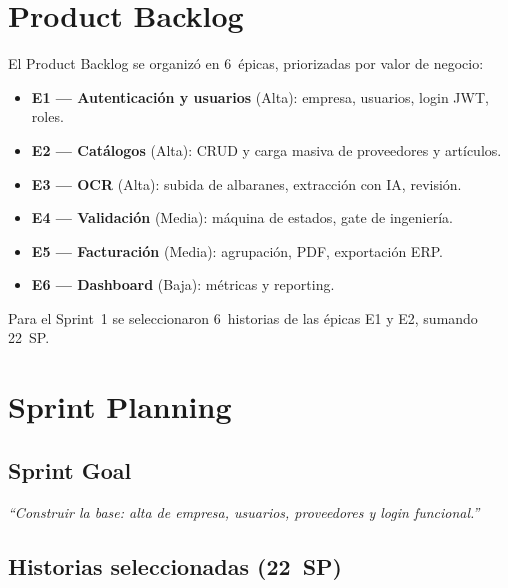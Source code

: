 \documentclass[11pt,a4paper]{article}
\begin{document}
\section{Product Backlog}

El Product Backlog se organizó en 6~épicas, priorizadas por valor de negocio:

\begin{itemize}
\item \textbf{E1 --- Autenticación y usuarios} (Alta): empresa, usuarios, login JWT, roles.
\item \textbf{E2 --- Catálogos} (Alta): CRUD y carga masiva de proveedores y artículos.
\item \textbf{E3 --- OCR} (Alta): subida de albaranes, extracción con IA, revisión.
\item \textbf{E4 --- Validación} (Media): máquina de estados, gate de ingeniería.
\item \textbf{E5 --- Facturación} (Media): agrupación, PDF, exportación ERP.
\item \textbf{E6 --- Dashboard} (Baja): métricas y reporting.
\end{itemize}

Para el Sprint~1 se seleccionaron 6~historias de las épicas E1 y E2, sumando 22~SP.

\section{Sprint Planning}

\subsection{Sprint Goal}
\emph{``Construir la base: alta de empresa, usuarios, proveedores y login funcional.''}

\subsection{Historias seleccionadas (22~SP)}
\end{document}
